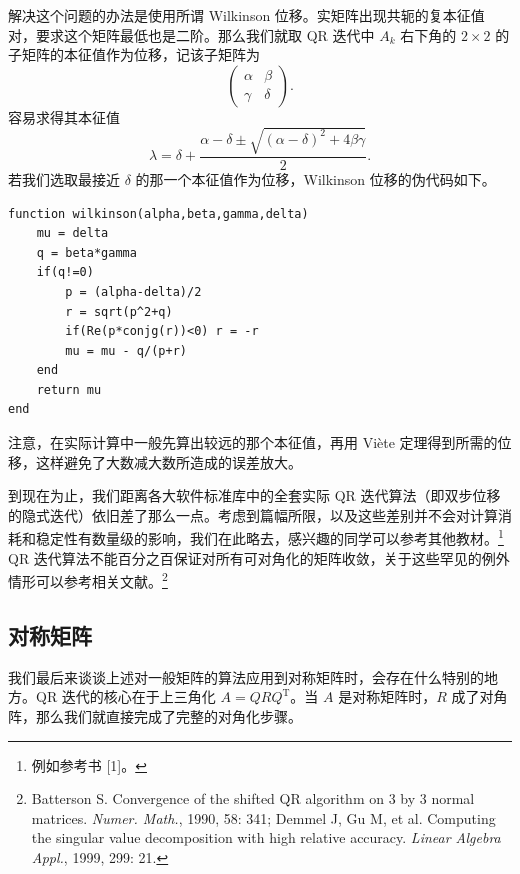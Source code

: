 解决这个问题的办法是使用所谓 Wilkinson 位移。实矩阵出现共轭的复本征值对，要求这个矩阵最低也是二阶。那么我们就取 QR 迭代中 $A_k$ 右下角的 $2\times2$ 的子矩阵的本征值作为位移，记该子矩阵为
\begin{equation}
\begin{pmatrix}\alpha&\beta\\\gamma&\delta\end{pmatrix}.
\tag{3.4.30}
\end{equation}
容易求得其本征值
\begin{equation}
\lambda=\delta+\frac{\alpha-\delta\pm\sqrt{(\alpha-\delta)^2+4\beta\gamma}}{2}.
\tag{3.4.31}
\end{equation}
若我们选取最接近 $\delta$ 的那一个本征值作为位移，Wilkinson 位移的伪代码如下。

\begin{algorithmBox}
\begin{lstlisting}[style=bellacode]
function wilkinson(alpha,beta,gamma,delta)
    mu = delta
    q = beta*gamma
    if(q!=0)
        p = (alpha-delta)/2
        r = sqrt(p^2+q)
        if(Re(p*conjg(r))<0) r = -r
        mu = mu - q/(p+r)
    end
    return mu
end
\end{lstlisting}
\end{algorithmBox}

注意，在实际计算中一般先算出较远的那个本征值，再用 Viète 定理得到所需的位移，这样避免了大数减大数所造成的误差放大。

到现在为止，我们距离各大软件标准库中的全套实际 QR 迭代算法（即双步位移的隐式迭代）依旧差了那么一点。考虑到篇幅所限，以及这些差别并不会对计算消耗和稳定性有数量级的影响，我们在此略去，感兴趣的同学可以参考其他教材。\footnote{例如参考书 [1]。} QR 迭代算法不能百分之百保证对所有可对角化的矩阵收敛，关于这些罕见的例外情形可以参考相关文献。\footnote{Batterson S. Convergence of the shifted QR algorithm on 3 by 3 normal matrices. \emph{Numer. Math.}, 1990, 58: 341; Demmel J, Gu M, et al. Computing the singular value decomposition with high relative accuracy. \emph{Linear Algebra Appl.}, 1999, 299: 21.}

\subsection{对称矩阵}

我们最后来谈谈上述对一般矩阵的算法应用到对称矩阵时，会存在什么特别的地方。QR 迭代的核心在于上三角化 $A=QRQ^{\mathrm T}$。当 $A$ 是对称矩阵时，$R$ 成了对角阵，那么我们就直接完成了完整的对角化步骤。


